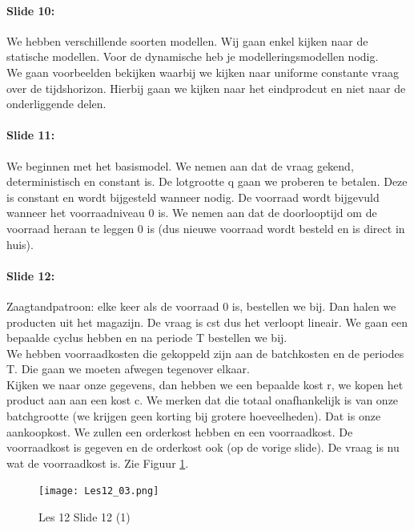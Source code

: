 \documentclass[10pt,a4paper]{report}
\begin{document}
\paragraph{Slide 10:} We hebben verschillende soorten modellen. Wij gaan enkel kijken naar de statische modellen. Voor de dynamische heb je modelleringsmodellen nodig.\\
We gaan voorbeelden bekijken waarbij we kijken naar uniforme constante vraag over de tijdshorizon. Hierbij gaan we kijken naar het eindprodcut en niet naar de onderliggende delen. %

\paragraph{Slide 11:} We beginnen met het basismodel. We nemen aan dat de vraag gekend, deterministisch en constant is. De lotgrootte q gaan we proberen te betalen. Deze is constant en wordt bijgesteld wanneer nodig. De voorraad wordt bijgevuld wanneer het voorraadniveau 0 is. We nemen aan dat de doorlooptijd om de voorraad heraan te leggen 0 is (dus nieuwe voorraad wordt besteld en is direct in huis).

\paragraph{Slide 12:} Zaagtandpatroon: elke keer als de voorraad 0 is, bestellen we bij. Dan halen we producten uit het magazijn. De vraag is cst dus het verloopt lineair. We gaan een bepaalde cyclus hebben en na periode T bestellen we bij. \\
We hebben voorraadkosten die gekoppeld zijn aan de batchkosten en de periodes T. Die gaan we moeten afwegen tegenover elkaar.\\ 
Kijken we naar onze gegevens, dan hebben we een bepaalde kost r, we kopen het product aan aan een kost c. We merken dat die totaal onafhankelijk is van onze batchgrootte (we krijgen geen korting bij grotere hoeveelheden). Dat is onze aankoopkost. We zullen een orderkost hebben en een voorraadkost. De voorraadkost is gegeven en de orderkost ook (op de vorige slide). De vraag is nu wat de voorraadkost is. Zie Figuur \ref{les12_03}.\\

\begin{figure}[h!]
\centering
\texttt{[image: Les12\_03.png]}
\caption{Les 12 Slide 12 (1)} 
\label{les12_03}
\end{figure}
\end{document}
